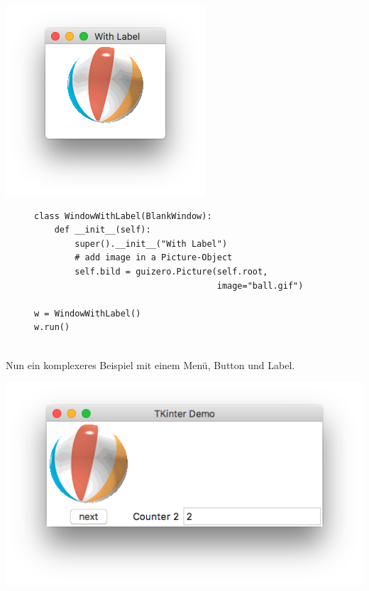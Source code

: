 \documentclass{tufte-handout}
\begin{document}
\begin{marginfigure}
	\begin{center}
		\includegraphics[width=\textwidth]{../with_label.png}
	\end{center}	
\end{marginfigure}

\begin{figure}
	\begin{lstlisting}
class WindowWithLabel(BlankWindow):
    def __init__(self):
        super().__init__("With Label")
        # add image in a Picture-Object
        self.bild = guizero.Picture(self.root,
                                    image="ball.gif")

w = WindowWithLabel()
w.run()
	
	\end{lstlisting}
\end{figure} 

\clearpage
Nun ein komplexeres Beispiel mit einem Menü, Button und Label.


\begin{marginfigure}[3cm]
	\begin{center}
		\includegraphics[width=1.2\textwidth]{../complex_demo.png}
	\end{center}	
\end{marginfigure}
\end{document}
